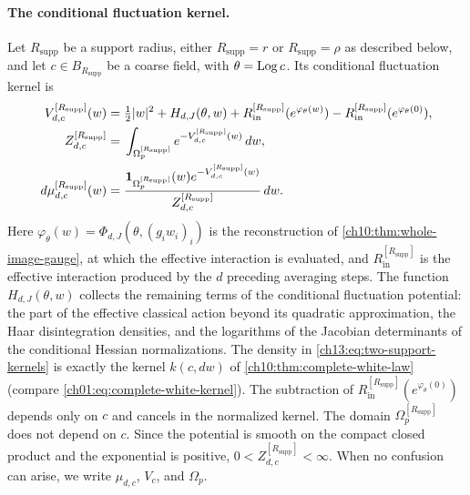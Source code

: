 \paragraph{The conditional fluctuation kernel.}
Let $R_{\mathrm{supp}}$ be a support radius, either $R_{\mathrm{supp}}=r$ or $R_{\mathrm{supp}}=\rho$ as described below, and let $c\in B_{R_{\mathrm{supp}}}$ be a coarse field, with $\theta=\operatorname{Log} c$. Its conditional fluctuation kernel is
\begin{equation}\label{ch13:eq:two-support-kernels}
 \begin{split}
 V_{d,c}^{[R_{\mathrm{supp}}]}(w)={}&\tfrac12\lvert w\rvert^2+H_{d,J}(\theta,w)
 +R_{\mathrm{in}}^{[R_{\mathrm{supp}}]}(e^{\varphi_\theta(w)})-R_{\mathrm{in}}^{[R_{\mathrm{supp}}]}(e^{\varphi_\theta(0)}),\\
 Z_{d,c}^{[R_{\mathrm{supp}}]}={}&\int_{\Omega_p^{[R_{\mathrm{supp}}]}}e^{-V_{d,c}^{[R_{\mathrm{supp}}]}(w)}\,dw,\\
 d\mu_{d,c}^{[R_{\mathrm{supp}}]}(w)={}&\frac{\mathbf 1_{\Omega_p^{[R_{\mathrm{supp}}]}}(w)e^{-V_{d,c}^{[R_{\mathrm{supp}}]}(w)}}{Z_{d,c}^{[R_{\mathrm{supp}}]}}\,dw.
 \end{split}
\end{equation}
Here $\varphi_\theta(w)=\Phi_{d,J}(\theta,(g_iw_i)_i)$ is the reconstruction of \cref{ch10:thm:whole-image-gauge}, at which the effective interaction is evaluated, and $R_{\mathrm{in}}^{[R_{\mathrm{supp}}]}$ is the effective interaction produced by the $d$ preceding averaging steps. The function $H_{d,J}(\theta,w)$ collects the remaining terms of the conditional fluctuation potential: the part of the effective classical action beyond its quadratic approximation, the Haar disintegration densities, and the logarithms of the Jacobian determinants of the conditional Hessian normalizations. The density in \eqref{ch13:eq:two-support-kernels} is exactly the kernel $k(c,dw)$ of \cref{ch10:thm:complete-white-law} (compare \eqref{ch01:eq:complete-white-kernel}). The subtraction of $R_{\mathrm{in}}^{[R_{\mathrm{supp}}]}(e^{\varphi_\theta(0)})$ depends only on $c$ and cancels in the normalized kernel. The domain $\Omega_p^{[R_{\mathrm{supp}}]}$ does not depend on $c$. Since the potential is smooth on the compact closed product and the exponential is positive, $0<Z_{d,c}^{[R_{\mathrm{supp}}]}<\infty$. When no confusion can arise, we write $\mu_{d,c}$, $V_c$, and $\Omega_p$.

